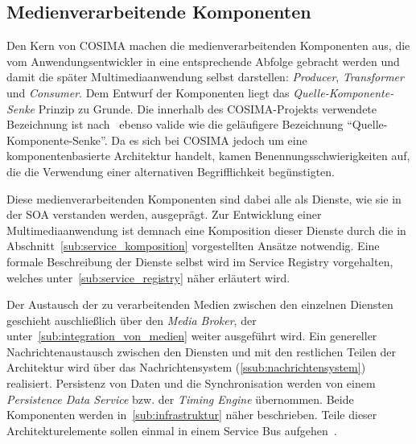 

\subsection{Medienverarbeitende Komponenten} %
\label{sub:medienverarbeitende_komponenten}

  Den Kern von COSIMA machen die medienverarbeitenden Komponenten aus, die vom Anwendungsentwickler in eine entsprechende Abfolge gebracht werden und damit die später Multimediaanwendung selbst darstellen: \emph{Producer}, \emph{Transformer} und \emph{Consumer}. Dem Entwurf der Komponenten liegt das \emph{Quelle-Komponente-Senke} Prinzip zu Grunde. Die innerhalb des COSIMA-Projekts verwendete Bezeichnung ist nach~\citep{a_multimedia_component_kit,multimedia_component_frameworks} ebenso valide wie die geläufigere Bezeichnung "`Quelle-Komponente-Senke"'. Da es sich bei COSIMA jedoch um eine komponentenbasierte Architektur handelt, kamen Benennungsschwierigkeiten auf, die die Verwendung einer alternativen Begrifflichkeit begünstigten.
  
  Diese medienverarbeitenden Komponenten sind dabei alle als Dienste, wie sie in der SOA verstanden werden, ausgeprägt. Zur Entwicklung einer Multimediaanwendung ist demnach eine Komposition dieser Dienste durch die in Abschnitt~\ref{sub:service_komposition} vorgestellten Ansätze notwendig. Eine formale Beschreibung der Dienste selbst wird im Service Registry vorgehalten, welches unter~\ref{sub:service_registry} näher erläutert wird.
  
  Der Austausch der zu verarbeitenden Medien zwischen den einzelnen Diensten geschieht auschließlich über den \emph{Media Broker}, der unter~\ref{sub:integration_von_medien} weiter ausgeführt wird. Ein genereller Nachrichtenaustausch zwischen den Diensten und mit den restlichen Teilen der Architektur wird über das Nachrichtensystem (\ref{ssub:nachrichtensystem}) realisiert. Persistenz von Daten und die Synchronisation werden von einem \emph{Persistence Data Service} bzw. der \emph{Timing Engine} übernommen. Beide Komponenten werden in~\ref{sub:infrastruktur} näher beschrieben. Teile dieser Architekturelemente sollen einmal in einem Service Bus aufgehen~\citep[S. 18]{bericht}.


